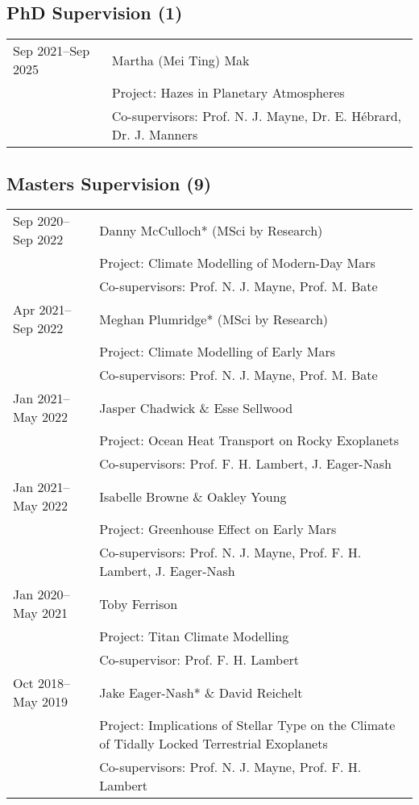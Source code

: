 \documentclass[a4paper, 11pt]{article}
\begin{document}
\subsection*{PhD Supervision (1)}
\begin{tabularx}{\linewidth}{@{}l X@{}}
Sep 2021--Sep 2025 & Martha (Mei Ting) Mak \\
                  & Project: Hazes in Planetary Atmospheres \\
                  & Co-supervisors: Prof. N. J. Mayne, Dr. E. Hébrard, Dr. J. Manners \\
\end{tabularx}

\subsection*{Masters Supervision (9)}
\begin{tabularx}{\linewidth}{@{}l X@{}}
Sep 2020--Sep 2022 & Danny McCulloch* (MSci by Research) \\
                  & Project: Climate Modelling of Modern-Day Mars \\
                  & Co-supervisors: Prof. N. J. Mayne, Prof. M. Bate \\
Apr 2021--Sep 2022 & Meghan Plumridge* (MSci by Research) \\
                  & Project: Climate Modelling of Early Mars \\
                  & Co-supervisors: Prof. N. J. Mayne, Prof. M. Bate \\
Jan 2021--May 2022 & Jasper Chadwick \& Esse Sellwood \\
                  & Project: Ocean Heat Transport on Rocky Exoplanets \\
                  & Co-supervisors: Prof. F. H. Lambert, J. Eager-Nash \\
Jan 2021--May 2022 & Isabelle Browne \& Oakley Young \\
                  & Project: Greenhouse Effect on Early Mars \\
                  & Co-supervisors: Prof. N. J. Mayne, Prof. F. H. Lambert, J. Eager-Nash \\
Jan 2020--May 2021 & Toby Ferrison \\
                  & Project: Titan Climate Modelling \\
                  & Co-supervisor: Prof. F. H. Lambert \\
Oct 2018--May 2019 & Jake Eager-Nash* \& David Reichelt \\
                  & Project: Implications of Stellar Type on the Climate of Tidally Locked Terrestrial Exoplanets \\
                  & Co-supervisors: Prof. N. J. Mayne, Prof. F. H. Lambert \\
\end{tabularx}
\end{document}
